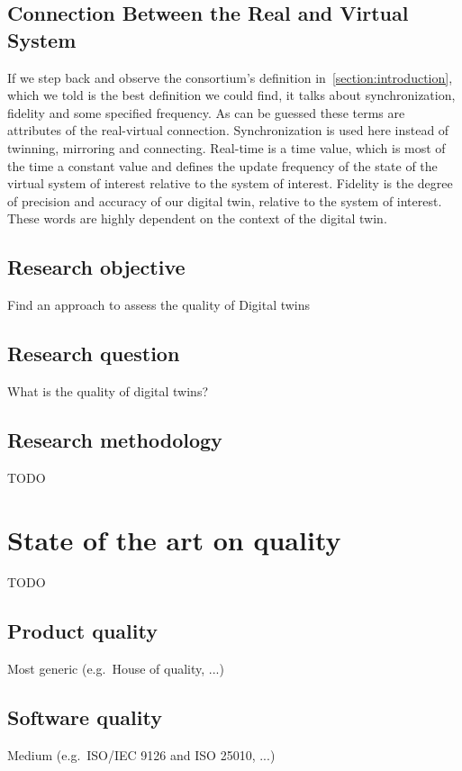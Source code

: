 \documentclass[9pt,conference]{IEEEtran}
\begin{document}
    \subsection*{Connection Between the Real and Virtual System}
    If we step back and observe the consortium's definition in~\ref{section:introduction}, which we told is the best definition we could find, 
    it talks about synchronization, fidelity and some specified frequency. As can be guessed these terms are attributes of the real-virtual connection.
    Synchronization is used here instead of twinning, mirroring and connecting. 
    Real-time is a time value, which is most of the time a constant value and defines the update frequency of the state of the virtual system of interest relative to the system of interest.
    Fidelity is the degree of precision and accuracy of our digital twin, relative to the system of interest.
    These words are highly dependent on the context of the digital twin.
    \subsection{Research objective}
    Find an approach to assess the quality of Digital twins~\cite{Jones2020}

    \subsection{Research question}\label{section: Research Questions}
    What is the quality of digital twins?

    \subsection{Research methodology}
    TODO

    \section{State of the art on quality}
    TODO

    \subsection{Product quality}
    Most generic (e.g.~House of quality, ...)

    \subsection{Software quality}
    Medium (e.g.~ISO/IEC 9126 and ISO 25010, ...)
\end{document}
